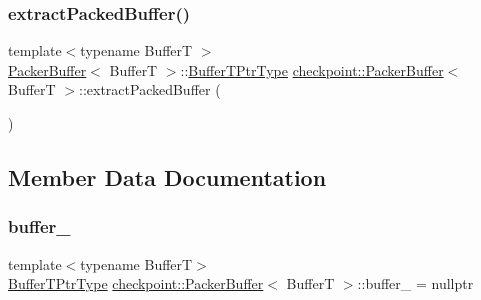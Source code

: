 \mbox{\label{structcheckpoint_1_1_packer_buffer_abc144f3a5d61a7eb886bd57241e7ed7e}} 
\subsubsection{\texorpdfstring{extract\+Packed\+Buffer()}{extractPackedBuffer()}}
{\footnotesize\ttfamily template$<$typename BufferT $>$ \\
\hyperlink{structcheckpoint_1_1_packer_buffer}{Packer\+Buffer}$<$ BufferT $>$\+::\hyperlink{structcheckpoint_1_1_packer_buffer_a081ec628050e8b173e413271fa070c26}{Buffer\+T\+Ptr\+Type} \hyperlink{structcheckpoint_1_1_packer_buffer}{checkpoint\+::\+Packer\+Buffer}$<$ BufferT $>$\+::extract\+Packed\+Buffer (\begin{DoxyParamCaption}{ }\end{DoxyParamCaption})}



\subsection{Member Data Documentation}
\mbox{\label{structcheckpoint_1_1_packer_buffer_ab07bd403ce6f2e644ff92532f9e363cb}} 
\subsubsection{\texorpdfstring{buffer\+\_\+}{buffer\_}}
{\footnotesize\ttfamily template$<$typename BufferT$>$ \\
\hyperlink{structcheckpoint_1_1_packer_buffer_a081ec628050e8b173e413271fa070c26}{Buffer\+T\+Ptr\+Type} \hyperlink{structcheckpoint_1_1_packer_buffer}{checkpoint\+::\+Packer\+Buffer}$<$ BufferT $>$\+::buffer\+\_\+ = nullptr\hspace{0.3cm}{\ttfamily [private]}}

\mbox{\label{structcheckpoint_1_1_packer_buffer_aac4e52e04c38fd611a6ed75e0d0df0a2}} 
